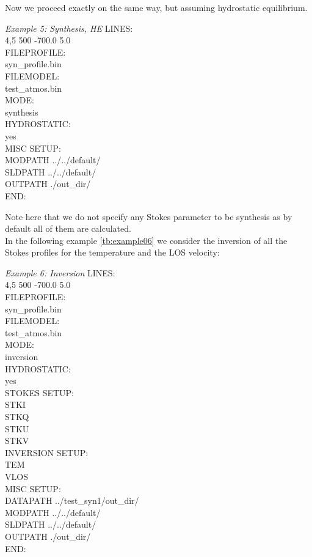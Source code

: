 
%

Now we proceed exactly on the same way, but assuming hydrostatic equilibrium.

\begin{ifbox}[label={tb:example05}]{{\it Example 5: Synthesis, HE}}
  \scriptsize
LINES:\\
4,5 500 -700.0 5.0\\
FILEPROFILE:\\
syn\_profile.bin\\
FILEMODEL:\\
test\_atmos.bin\\
MODE:\\
synthesis\\
HYDROSTATIC:\\
yes\\
MISC SETUP:\\
MODPATH ../../default/\\
SLDPATH ../../default/\\
OUTPATH ./out\_dir/\\
END:
  \normalsize
\end{ifbox}

Note here that we do not specify any Stokes parameter to be synthesis as by default all of them are calculated.\\

In the following example \ref{tb:example06} we consider the inversion of all the Stokes profiles for the temperature and the LOS velocity:\\

%

\begin{ifbox}[label={tb:example06}]{{\it Example 6: Inversion}}
  \scriptsize
LINES:\\
4,5 500 -700.0 5.0\\
FILEPROFILE:\\
syn\_profile.bin\\
FILEMODEL:\\
test\_atmos.bin\\
MODE:\\
inversion\\
HYDROSTATIC:\\
yes\\
STOKES SETUP:\\
STKI\\
STKQ\\
STKU\\
STKV\\
INVERSION SETUP:\\
TEM\\
VLOS\\
MISC SETUP:\\
DATAPATH ../test\_syn1/out\_dir/\\
MODPATH ../../default/\\
SLDPATH ../../default/\\
OUTPATH ./out\_dir/\\
END:
  \normalsize
\end{ifbox}

